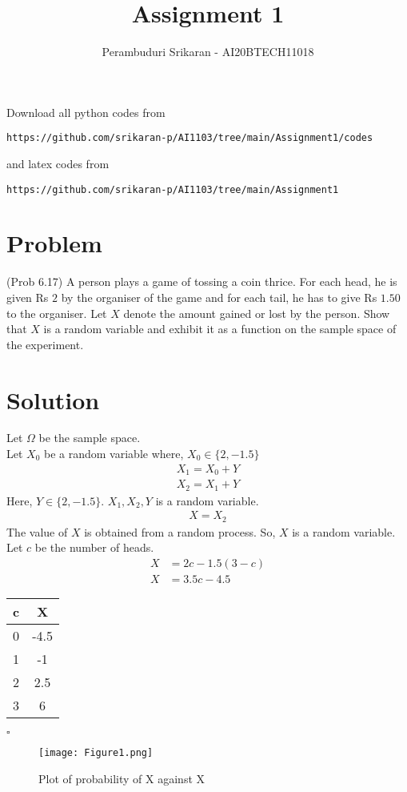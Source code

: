 \documentclass[journal,12pt,twocolumn]{IEEEtran}
\begin{document}
     \def\rightbox#1{\makebox[0in][r]{#1}}
     \def\centbox#1{\makebox[0in]{#1}}
     \def\topbox#1{\raisebox{-\baselineskip}[0in][0in]{#1}}
     \def\midbox#1{\raisebox{-0.5\baselineskip}[0in][0in]{#1}}
\vspace{3cm}
\title{Assignment 1}
\author{Perambuduri Srikaran - AI20BTECH11018}
\maketitle
\newpage
\bigskip
\renewcommand{\thefigure}{\theenumi}
\renewcommand{\thetable}{\theenumi}
Download all python codes from
\begin{lstlisting}
https://github.com/srikaran-p/AI1103/tree/main/Assignment1/codes
\end{lstlisting}
and latex codes from 
\begin{lstlisting}
https://github.com/srikaran-p/AI1103/tree/main/Assignment1
\end{lstlisting}
\section*{Problem}
(Prob 6.17) A person plays a game of tossing a coin thrice. For each head, he is given Rs $2$ by the organiser of the game and for each tail, he has to give Rs $1.50$ to the organiser. Let $X$ denote the amount gained or lost by the person. Show that $X$ is a random variable and exhibit it as a function on the sample space of the experiment.
\section*{Solution}
Let $\Omega$ be the sample space.\\
Let $X_0$ be a random variable where, $X_0 \in \{2, -1.5\}$
\begin{align*}
    X_1 = X_0 + Y \\
    X_2 = X_1 + Y
\end{align*}
Here, $Y \in \{2, -1.5\}$. $X_1, X_2, Y$ is a random variable.
\begin{align*}
    X = X_2
\end{align*}
The value of $X$ is obtained from a random process. So, $X$ is a random variable. \\
Let $c$ be the number of heads. 
\begin{align*}
    X &= 2c - 1.5(3 - c) \\
    X &= 3.5c - 4.5
\end{align*}
\begin{center}
\begin{tabular}{|c|c|}
\hline
c & X    \\ \hline
0 & -4.5 \\ \hline
1 & -1   \\ \hline
2 & 2.5  \\ \hline
3 & 6  \\ \hline
\end{tabular}
\end{center}
$\square$
\begin{figure}[htp]
    \centering
    \texttt{[image: Figure1.png]}
    \caption{Plot of probability of X against X}
    \label{fig:plot}
\end{figure}
\end{document}
